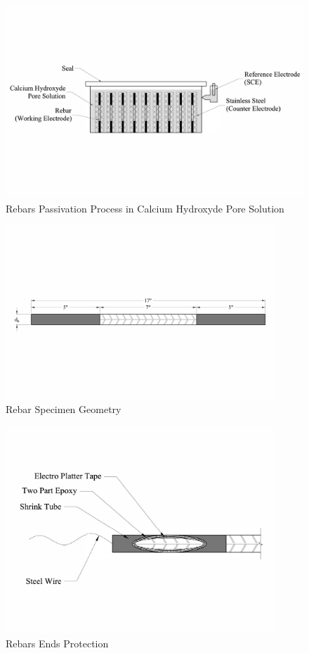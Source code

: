 \begin{figure}[htbp]
	\centering
	\includegraphics[width=1.0\textwidth]{Chapter-3/figs/AnodicPolarization_01}
	\caption{Rebars Passivation Process in Calcium Hydroxyde Pore Solution}
	\label{fig:RebarPassivation}
\end{figure}

\begin{figure}[htbp]
	\centering
	\includegraphics[width=0.9\textwidth]{Chapter-3/figs/RebarSamples}
	\caption{Rebar Specimen Geometry}
	\label{fig:RebarSpecimenGeomtry}
\end{figure}

\begin{figure}[htbp]
	\centering
	\includegraphics[width=0.9\textwidth]{Chapter-3/figs/Rebar_Ends}
	\caption{Rebars Ends Protection}
	\label{fig:RebarEndsProtection}
\end{figure}


